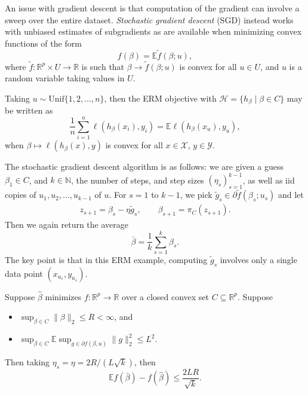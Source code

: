 \documentclass[12pt]{article}
\begin{document}
An issue with gradient descent is that computation of the gradient can involve a sweep over the entire dataset. \emph{Stochastic gradient descent} (SGD) instead works with unbiased estimates of subgradients as are available when minimizing convex functions of the form
\[
f(\beta) = \mathbb{E} \tilde f(\beta; u),
\]
where $\tilde f : \mathbb{R}^p \times U \to \mathbb{R}$ is such that $\beta \to \tilde f(\beta; u)$ is convex for all $u \in U$, and $u$ is a random variable taking values in $U$.

\begin{exbox}[Important]
	Taking $u \sim \mathrm{Unif}\{1, 2, \ldots, n\}$, then the ERM objective with $\mathcal{H} = \{h_\beta \mid \beta \in C\}$ may be written as
	\[
	\frac{1}{n} \sum_{i = 1}^n \ell(h_\beta(x_i), y_i) = \mathbb{E} \ell(h_\beta(x_u), y_u),
	\]
	when $\beta \mapsto \ell(h_\beta(x), y)$ is convex for all $x \in \mathcal{X}$, $y \in \mathcal{Y}$.
\end{exbox}

The stochastic gradient descent algorithm is as follows: we are given a guess $\beta_1 \in C$, and $k \in \mathbb{N}$, the number of steps, and step sizes $(\eta_s)_{s = 1}^{k-1}$, as well as iid copies of $u_1, u_2, \ldots, u_{k-1}$ of $u$. For $s = 1$ to $k-1$, we pick $\tilde g_s \in \partial \tilde f(\beta_s; u_s)$ and let
\begin{align*}
	z_{s+1} = \beta_s - \eta \tilde g_s, \qquad \beta_{s+1} = \pi_C(z_{s+1}).
\end{align*}
Then we again return the average
\[
\bar \beta = \frac{1}{k}\sum_{s = 1}^k \beta_s.
\]
The key point is that in this ERM example, computing $\tilde g_s$ involves only a single data point $(x_{u_s}, y_{u_s})$.

\begin{theorem}
	Suppose $\hat \beta$ minimizes $f : \mathbb{R}^p \to \mathbb{R}$ over a closed convex set $C \subseteq \mathbb{R}^p$. Suppose
	\begin{itemize}
		\item $\sup_{\beta \in C} \|\beta\|_2 \leq R < \infty$, and
		\item $\sup_{\beta \in C} \mathbb{E} \sup_{g \in \partial f(\beta, u)} \|g\|_2^2 \leq L^2$.
	\end{itemize}
	Then taking $\eta_s = \eta = 2R/(L\sqrt k)$, then
	\[
	\mathbb{E} f(\bar \beta) - f(\hat \beta) \leq \frac{2LR}{\sqrt k}.
	\]
\end{theorem}

\end{document}
